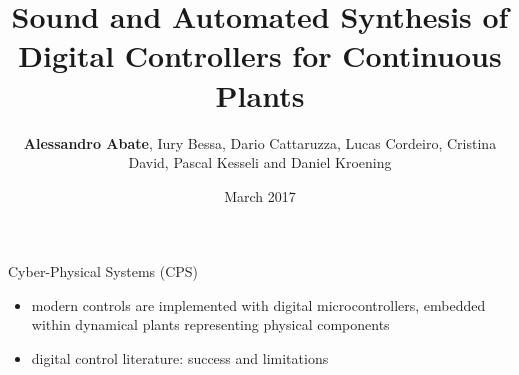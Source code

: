 \documentclass{beamer}
\begin{document}
\title {Sound and Automated Synthesis of Digital Controllers for Continuous Plants}

\author{\textbf{Alessandro Abate}, Iury Bessa, Dario Cattaruzza, Lucas Cordeiro, Cristina David, Pascal Kesseli and Daniel Kroening}

\date{March 2017}

\frame{\maketitle}

\begin{frame}{Cyber-Physical Systems (CPS)}

\begin{itemize}
\item 
modern controls are implemented with digital microcontrollers, 
embedded within dynamical plants representing physical components 
\item 
digital control literature: success and limitations 
\end{itemize} 


\end{frame}
\end{document}
